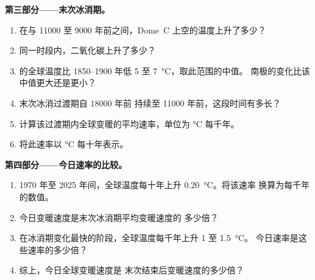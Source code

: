 \begin{problem}
\medskip
\noindent\textbf{第三部分——末次冰消期。}
\begin{enumerate}[resume]
  \item 在与 \num{11000} 至 \num{9000}
        年前之间，Dome~C 上空的温度上升了多少？
  \item 同一时段内，二氧化碳上升了多少？
  \item {}的全球温度比 1850--1900 年低 5 至
        \qty{7}{\degreeCelsius}，取此范围的中值。
        南极的变化比该中值更大还是更小？
  \item 末次冰消过渡期自 \num{18000} 年前
        持续至 \num{11000} 年前，这段时间有多长？
  \item 计算该过渡期内全球变暖的平均速率，单位为
        \unit{\degreeCelsius} 每千年。
  \item 将此速率以 \unit{\degreeCelsius} 每十年表示。
\end{enumerate}

\medskip
\noindent\textbf{第四部分——今日速率的比较。}
\begin{enumerate}[resume]
  \item 1970 年至 2025 年间，全球温度每十年上升
        \qty{0.20}{\degreeCelsius}。将该速率
        换算为每千年的数值。
  \item 今日变暖速度是末次冰消期平均变暖速度的
        多少倍？
  \item 在冰消期变化最快的阶段，全球温度每千年上升 1 至
        \qty{1.5}{\degreeCelsius}。
        今日速率是这些速率的多少倍？
  \item 综上，今日全球变暖速度是
        末次结束后变暖速度的多少倍？
\end{enumerate}
\end{problem}
